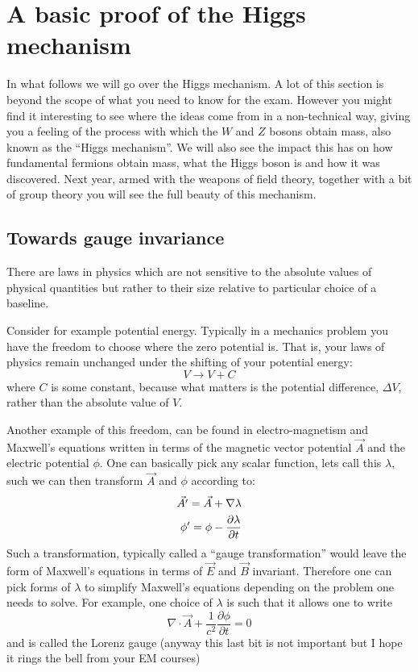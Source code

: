 \section{A basic proof of the Higgs mechanism}
\label{sec:higgs_proof}
In what follows we will go over the Higgs mechanism. A lot of this section is beyond the scope of what
you need to know for the exam. However you might find it interesting to see where the ideas come from
in a non-technical way, giving you a feeling of the 
process with which the $W$ and $Z$ bosons obtain mass, also known as the ``Higgs mechanism''. We will also see the impact this has on how fundamental fermions obtain mass, what the Higgs boson is and how it was discovered. Next year, armed with the weapons of field theory, together with a bit of group theory you will see the full beauty of this mechanism.

\subsection{Towards gauge invariance}

There are laws in physics which are not sensitive
to the absolute values of physical quantities but rather to their size relative to particular choice of a baseline. 

Consider for example potential energy. Typically in a mechanics problem you have the freedom to choose where the zero potential is. That is, your laws of physics remain unchanged under the shifting of your potential energy:\[V\to V+C\] where $C$ is some constant, because what matters is the potential difference, $\Delta V$, rather than the absolute value of $V$.

Another example of this freedom, can be found in electro-magnetism and Maxwell's equations written in terms of the magnetic vector potential $\vec{A}$ and the electric potential $\phi$. One can basically pick any scalar function, lets call this $\lambda$, such we can then transform $\vec{A}$ and $\phi$ according to:
\begin{eqnarray}
\label{eq:gauge_transformation}
\vec{A'}=\vec{A}+\nabla\lambda\\
\phi'=\phi-\frac{\partial\lambda}{\partial t}\notag
\end{eqnarray}
Such a transformation, typically called a ``gauge transformation'' would leave the form of Maxwell's equations in terms of $\vec{E}$ and $\vec{B}$ invariant. Therefore one can pick forms of $\lambda$ to simplify Maxwell's equations depending on the problem one needs to solve. For example, one choice of $\lambda$ is such that it allows one to write
\[
\nabla\cdot\vec{A}+\frac{1}{c^2}\frac{\partial\phi}{\partial t}=0
\]
and is called the Lorenz gauge (anyway this last bit is not important but I hope it rings the bell from your EM courses)

